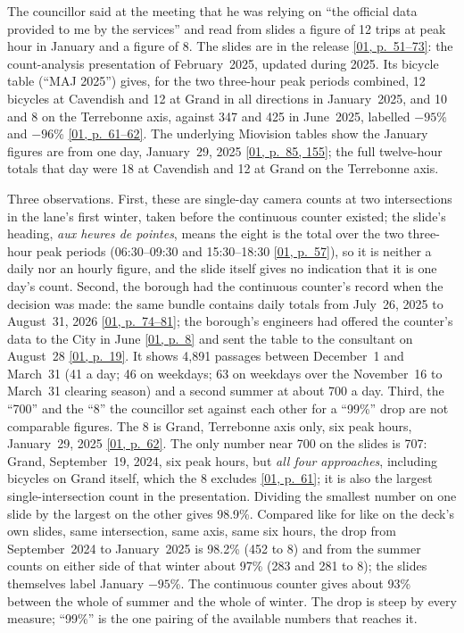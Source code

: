\documentclass[11pt,letterpaper]{article}
\newcommand{\pagesurl}{https://openmobilitydata.github.io/Terrebonne-access-requests}
\newcommand{\pgl}[3]{\href{\pagesurl/\csname bundle#1\endcsname\#page=#2}{\textsf{\small[#1, p.~#3]}}}
\newcommand{\pg}[2]{\pgl{#1}{#2}{#2}}
\begin{document}
The councillor said at the meeting that he was relying on ``the official
data provided to me by the services'' and read from slides a figure of 12
trips at peak hour in January and a figure of 8. The slides are in the
release \pgl{01}{51}{51--73}: the count-analysis presentation of February~2025,
updated during 2025. Its bicycle table (``MAJ 2025'') gives, for the two
three-hour peak periods combined, 12 bicycles at Cavendish and 12 at Grand
in all directions in January~2025, and 10 and 8 on the Terrebonne axis,
against 347 and 425 in June~2025, labelled $-95$\% and $-96$\%
\pgl{01}{61}{61--62}. The underlying Miovision tables show the January figures
are from one day, January~29, 2025 \pgl{01}{85}{85, 155}; the full twelve-hour
totals that day were 18 at Cavendish and 12 at Grand on the Terrebonne axis.

Three observations. First, these are single-day camera counts at two
intersections in the lane's first winter, taken before the continuous
counter existed; the slide's heading, \emph{aux heures de pointes}, means
the eight is the total over the two three-hour peak periods (06:30--09:30
and 15:30--18:30 \pg{01}{57}), so it is neither a daily nor an hourly
figure, and the slide itself gives no indication that it is one day's
count. Second, the borough had the continuous counter's record
when the decision was made: the same bundle contains daily totals from
July~26, 2025 to August~31, 2026 \pgl{01}{74}{74--81}; the borough's
engineers had offered the counter's data to the City in June \pg{01}{8}
and sent the table to the consultant on August~28 \pg{01}{19}. It shows
4{,}891 passages between December~1 and March~31 (41 a day; 46 on
weekdays; 63 on weekdays over the November~16 to March~31 clearing season)
and a second summer at about 700 a day. Third, the ``700'' and the ``8''
the councillor set against each other for a ``99\%'' drop are not
comparable figures. The 8 is Grand, Terrebonne axis only, six peak hours,
January~29, 2025 \pg{01}{62}. The only number near 700 on the slides is
707: Grand, September~19, 2024, six peak hours, but \emph{all four
approaches}, including bicycles on Grand itself, which the 8 excludes
\pg{01}{61}; it is also the largest single-intersection count in the
presentation. Dividing the smallest number on one slide by the largest on
the other gives 98.9\%. Compared like for like on the deck's own slides,
same intersection, same axis, same six hours, the drop from September~2024
to January~2025 is 98.2\% (452 to 8) and from the summer counts on either
side of that winter about 97\% (283 and 281 to 8); the slides themselves
label January $-95$\%. The continuous counter gives about 93\% between the
whole of summer and the whole of winter. The drop is steep by every
measure; ``99\%'' is the one pairing of the available numbers that reaches
it.
\end{document}
